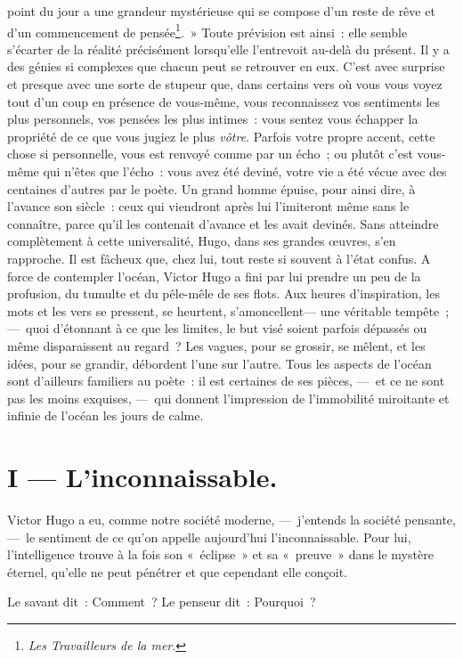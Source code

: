 \documentclass[french,twoside]{book} %
\begin{document}
point du jour a une grandeur mystérieuse qui se compose d’un reste de rêve et d’un commencement de pensée\footnote{\emph{Les Travailleurs de la mer}.}. » Toute prévision est ainsi : elle semble s’écarter de la réalité précisément lorsqu’elle l’entrevoit au-delà du présent. Il y a des génies si complexes que chacun peut se retrouver en eux. C’est avec surprise et presque avec une sorte de stupeur que, dans certains vers où vous vous voyez tout d’un coup en présence de vous-même, vous reconnaissez vos sentiments les plus personnels, vos pensées les plus intimes : vous sentez vous échapper la propriété de ce que vous jugiez le plus \emph{vôtre}. Parfois votre propre accent, cette chose si personnelle, vous est renvoyé comme par un écho ; ou plutôt c’est vous-même qui n’êtes que l’écho : vous avez été deviné, votre vie a été vécue avec des centaines d’autres par le poète. Un grand homme épuise, pour ainsi dire, à l’avance son siècle : ceux qui viendront après lui l’imiteront même sans le connaître, parce qu’il les contenait d’avance et les avait devinés. Sans atteindre complètement à cette universalité, Hugo, dans ses grandes œuvres, s’en rapproche. Il est fâcheux que, chez lui, tout reste si souvent à l’état confus. A force de contempler l’océan, Victor Hugo a fini par lui prendre un peu de la profusion, du tumulte et du pêle-mêle de ses flots. Aux heures d’inspiration, les mots et les vers se pressent, se heurtent, s’amoncellent— une véritable tempête ; — quoi d’étonnant à ce que les limites, le but visé soient parfois dépassés ou même disparaissent au regard ? Les vagues, pour se grossir, se mêlent, et les idées, pour se grandir, débordent l’une sur l’autre. Tous les aspects de l’océan sont d’ailleurs familiers au poète : il est certaines de ses pièces, — et ce ne sont pas les moins exquises, — qui donnent l’impression de l’immobilité miroitante et infinie de l’océan les jours de calme.\par
\section[{I — L’inconnaissable.}]{I — L’inconnaissable.}
\noindent Victor Hugo a eu, comme notre société moderne, — j’entends la société pensante, — le sentiment de ce qu’on appelle aujourd’hui l’inconnaissable. Pour lui, l’intelligence trouve à la fois son « éclipse » et sa « preuve » dans le mystère éternel, qu’elle ne peut pénétrer et que cependant elle conçoit.\par

Le savant dit : Comment ? Le penseur dit : Pourquoi ?\\
\end{document}
